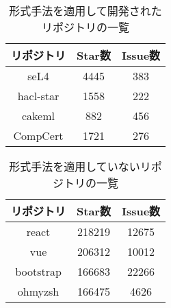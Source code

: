 \documentclass[main]{subfiles}
\begin{document}

\begin{table}[p]
	\centering
	\caption{形式手法を適用して開発されたリポジトリの一覧}
	\label{tab:repository_formal}
	\begin{tabular}{ccc} %
		\hline
		リポジトリ & Star数 & Issue数 \\\hline
		seL4       & 4445   & 383     \\
		hacl-star  & 1558   & 222     \\
		cakeml     & 882    & 456     \\
		CompCert   & 1721   & 276     \\\hline
	\end{tabular}
\end{table}

\begin{table}[p]
	\centering
	\caption{形式手法を適用していないリポジトリの一覧}
	\label{tab:repository_common}
	\begin{tabular}{ccc} %
		\hline
		リポジトリ & Star数 & Issue数 \\\hline
		react      & 218219 & 12675   \\
		vue        & 206312 & 10012   \\
		bootstrap  & 166683 & 22266   \\
		ohmyzsh    & 166475 & 4626    \\\hline
	\end{tabular}
\end{table}


\end{document}
